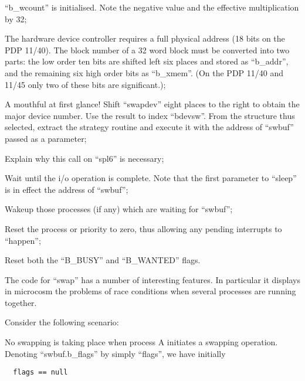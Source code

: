 \item[5208:] ``b\_wcount'' is initialised. Note
 the negative value and the effective multiplication by 32;

\item[5210:] The hardware device controller
requires a full physical address
(18 bits on the PDP 11/40). The
block number of a 32 word block
must be converted into two parts:
the low order ten bits are
shifted left six places and
stored as ``b\_addr'', and the
remaining six high order bits as
``b\_xmem''. (On the PDP 11/40 and
11/45 only two of these bits are
significant.);

\item[5212:] A mouthful at first glance! Shift
``swapdev'' eight places to the
right to obtain the major device
number. Use the result to index
``bdevsw''. From the structure
thus selected, extract the strategy routine and execute it with
the address of ``swbuf'' passed as
a parameter;

\item[5213:] Explain why this call on ``spl6''
is necessary;

\item[5214:] Wait until the i/o operation is
 complete. Note that the first
 parameter to ``sleep'' is in effect
 the address of ``swbuf'';

\item[5216:] Wakeup those processes (if any)
 which are waiting for ``swbuf'';

\item[5218:] Reset the process or priority to
 zero, thus allowing any pending
 interrupts to ``happen'';

\item[5219:] Reset both the ``B\_BUSY'' and
 ``B\_WANTED'' flags.
\ed


The code for ``swap'' has a number of
interesting features. In particular it
displays in microcosm the problems of
race conditions when several processes
are running together.

\bigskip

\noindent Consider the following scenario:

No swapping is taking place when process A initiates a swapping operation.
Denoting ``swbuf.b\_flags'' by simply
``flags'', we have initially

\begin{verbatim}
  flags == null
\end{verbatim}


